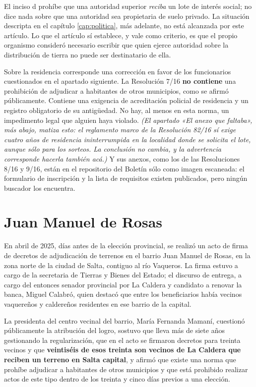 \begin{cautela}
El inciso d prohíbe que una autoridad superior \textit{reciba} un lote de interés social; no dice nada sobre que una autoridad sea propietaria de suelo privado. La situación descripta en el capítulo \ref{cap:politica}, más adelante, no está alcanzada por este artículo. Lo que el artículo sí establece, y vale como criterio, es que el propio organismo consideró necesario escribir que quien ejerce autoridad sobre la distribución de tierra no puede ser destinatario de ella.

Sobre la residencia corresponde una corrección en favor de los funcionarios cuestionados en el apartado siguiente. La Resolución 7/16 \textbf{no contiene} una prohibición de adjudicar a habitantes de otros municipios, como se afirmó públicamente. Contiene una exigencia de acreditación policial de residencia y un registro obligatorio de su antigüedad. No hay, al menos en esta norma, un impedimento legal que alguien haya violado. \textit{(El apartado «El anexo que faltaba», más abajo, matiza esto: el reglamento marco de la Resolución 82/16 sí exige cuatro años de residencia ininterrumpida en la localidad donde se solicita el lote, aunque sólo para los sorteos. La conclusión no cambia, y la advertencia corresponde hacerla también acá.)} Y sus anexos, como los de las Resoluciones 8/16 y 9/16, están en el repositorio del Boletín sólo como imagen escaneada: el formulario de inscripción y la lista de requisitos existen publicados, pero ningún buscador los encuentra.
\end{cautela}

\section{Juan Manuel de Rosas}

En abril de 2025, días antes de la elección provincial, se realizó un acto de firma de decretos de adjudicación de terrenos en el barrio Juan Manuel de Rosas, en la zona norte de la ciudad de Salta, contiguo al río Vaqueros. La firma estuvo a cargo de la secretaria de Tierras y Bienes del Estado; el discurso de entrega, a cargo del entonces senador provincial por La Caldera y candidato a renovar la banca, Miguel Calabró, quien destacó que entre los beneficiarios había vecinos vaquereños y caldereños residentes en ese barrio de la capital.

La presidenta del centro vecinal del barrio, María Fernanda Mamaní, cuestionó públicamente la atribución del logro, sostuvo que lleva más de siete años gestionando la regularización, que en el acto se firmaron decretos para treinta vecinos y que \textbf{veintiséis de esos treinta son vecinos de La Caldera que reciben un terreno en Salta capital}, y afirmó que existe una norma que prohíbe adjudicar a habitantes de otros municipios y que está prohibido realizar actos de este tipo dentro de los treinta y cinco días previos a una elección.

